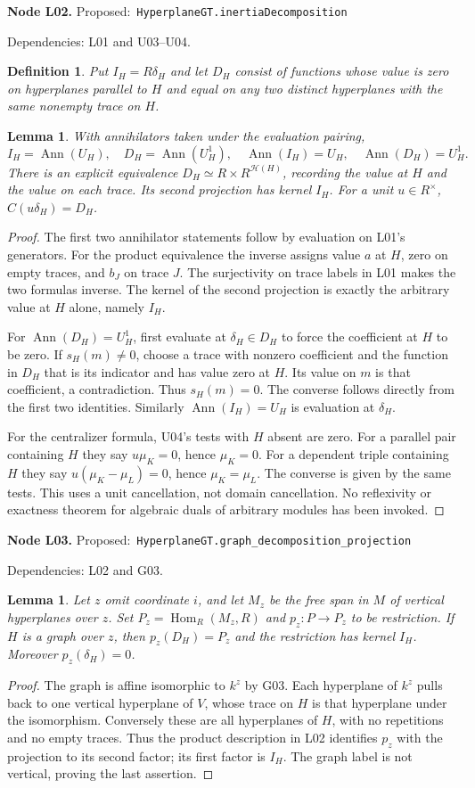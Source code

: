 \documentclass[11pt]{article}
\newtheorem{lemma}[theorem]{Lemma}
\newtheorem{definition}[theorem]{Definition}
\theoremstyle{remark}\newtheorem{remark}[theorem]{Remark}
\newcommand{\cH}{\mathcal H}
\newcommand{\Hom}{\operatorname{Hom}}
\newcommand{\Ann}{\operatorname{Ann}}
\newcommand{\code}[1]{\nolinkurl{#1}}
\newcommand{\node}[3]{\par\Needspace{8\baselineskip}\smallskip\noindent\textbf{Node #1.}\quad
 \textsf{Proposed:}\ \code{#2}\par\noindent
 \textsf{Dependencies:} #3.\par\smallskip}
\begin{document}
\node{L02}{HyperplaneGT.inertiaDecomposition}{L01 and U03--U04}
\begin{definition}\label{def:l02}
Put $I_H=R\delta_H$ and let $D_H$ consist of functions whose
value is zero on hyperplanes parallel to $H$ and equal on any two
distinct hyperplanes with the same nonempty trace on $H$.
\end{definition}
\begin{lemma}\label{lem:l02}
With annihilators taken under the evaluation pairing,
\[
 I_H=\Ann(U_H),\quad D_H=\Ann(U_H^1),\quad
 \Ann(I_H)=U_H,\quad\Ann(D_H)=U_H^1.
\]
There is an explicit equivalence
$D_H\simeq R\times R^{\cH(H)}$, recording the value at $H$ and
the value on each trace. Its second projection has kernel $I_H$.
For a unit $u\in R^\times$, $C(u\delta_H)=D_H$.
\end{lemma}
\begin{proof}
The first two annihilator statements follow by evaluation on L01's
generators. For the product equivalence the inverse assigns value
$a$ at $H$, zero on empty traces, and $b_J$ on trace $J$. The
surjectivity on trace labels in L01 makes the two formulas inverse.
The kernel of the second projection is exactly the arbitrary value
at $H$ alone, namely $I_H$.

For $\Ann(D_H)=U_H^1$, first evaluate at $\delta_H\in D_H$ to
force the coefficient at $H$ to be zero. If $s_H(m)\ne0$, choose
a trace with nonzero coefficient and the function in $D_H$ that
is its indicator and has value zero at $H$. Its value on $m$ is
that coefficient, a contradiction. Thus $s_H(m)=0$. The converse
follows directly from the first two identities. Similarly
$\Ann(I_H)=U_H$ is evaluation at $\delta_H$.

For the centralizer formula, U04's tests with $H$ absent are zero.
For a parallel pair containing $H$ they say $u\mu_K=0$, hence
$\mu_K=0$. For a dependent triple containing $H$ they say
$u(\mu_K-\mu_L)=0$, hence $\mu_K=\mu_L$. The converse is given
by the same tests. This uses a unit cancellation, not domain
cancellation. No reflexivity or exactness theorem for algebraic
duals of arbitrary modules has been invoked.
\end{proof}

\node{L03}{HyperplaneGT.graph_decomposition_projection}{L02 and G03}
\begin{lemma}\label{lem:l03}
Let $z$ omit coordinate $i$, and let $M_z$ be the free span in
$M$ of vertical hyperplanes over $z$. Set $P_z=\Hom_R(M_z,R)$
and $p_z:P\to P_z$ to be restriction. If $H$ is a graph over $z$,
then $p_z(D_H)=P_z$ and the restriction has kernel $I_H$.
Moreover $p_z(\delta_H)=0$.
\end{lemma}
\begin{proof}
The graph is affine isomorphic to $k^z$ by G03. Each hyperplane
of $k^z$ pulls back to one vertical hyperplane of $V$, whose trace
on $H$ is that hyperplane under the isomorphism. Conversely these
are all hyperplanes of $H$, with no repetitions and no empty
traces. Thus the product description in L02 identifies $p_z$
with the projection to its second factor; its first factor is
$I_H$. The graph label is not vertical, proving the last assertion.
\end{proof}
\end{document}
